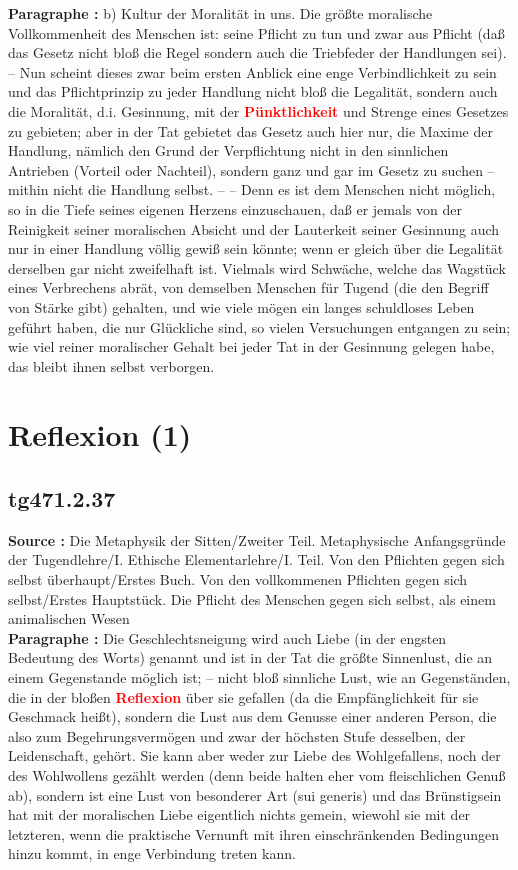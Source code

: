 \documentclass[a4paper,12pt,twoside]{book}
\newcommand{\match}[1]{\textcolor{red}{\textbf{#1}}}
\newcommand{\unnumberedsection}[1]{
	\section*{#1}
	\addcontentsline{toc}{section}{#1}
	\markright{#1}
}
\begin{document}
	\textbf{Paragraphe : }b) Kultur der Moralität in uns. Die größte moralische Vollkommenheit des Menschen ist: seine Pflicht zu tun und zwar aus Pflicht (daß das Gesetz nicht bloß die Regel sondern auch die Triebfeder der Handlungen sei). – Nun scheint dieses zwar beim ersten Anblick eine enge Verbindlichkeit zu sein und das Pflichtprinzip zu jeder Handlung nicht bloß die Legalität, sondern auch die Moralität, d.i. Gesinnung, mit der \match{Pünktlichkeit} und Strenge eines Gesetzes zu gebieten; aber in der Tat gebietet das Gesetz auch hier nur, die Maxime der Handlung, nämlich den Grund der Verpflichtung nicht in den sinnlichen Antrieben (Vorteil oder Nachteil), sondern ganz und gar im Gesetz zu suchen – mithin nicht die Handlung selbst. – – Denn es ist dem Menschen nicht möglich, so in die Tiefe seines eigenen Herzens einzuschauen, daß er jemals von der Reinigkeit seiner moralischen Absicht und der Lauterkeit seiner Gesinnung auch nur in einer Handlung völlig gewiß sein könnte; wenn er gleich über die Legalität derselben gar nicht zweifelhaft ist. Vielmals wird Schwäche, welche das Wagstück eines Verbrechens abrät, von demselben Menschen für Tugend (die den Begriff von Stärke gibt) gehalten, und wie viele mögen ein langes schuldloses Leben geführt haben, die nur Glückliche sind, so vielen Versuchungen entgangen zu sein; wie viel reiner moralischer Gehalt bei jeder Tat in der Gesinnung gelegen habe, das bleibt ihnen selbst verborgen. 
	
	\unnumberedsection{Reflexion (1)} 
	\subsection*{tg471.2.37} 
	\textbf{Source : }Die Metaphysik der Sitten/Zweiter Teil. Metaphysische Anfangsgründe der Tugendlehre/I. Ethische Elementarlehre/I. Teil. Von den Pflichten gegen sich selbst überhaupt/Erstes Buch. Von den vollkommenen Pflichten gegen sich selbst/Erstes Hauptstück. Die Pflicht des Menschen gegen sich selbst, als einem animalischen Wesen\\  
	
	\textbf{Paragraphe : }Die Geschlechtsneigung wird auch Liebe (in der engsten Bedeutung des Worts) genannt und ist in der Tat die größte Sinnenlust, die an einem Gegenstande möglich ist; – nicht bloß sinnliche Lust, wie an Gegenständen, die in der bloßen \match{Reflexion} über sie gefallen (da die Empfänglichkeit für sie Geschmack heißt), sondern die Lust aus dem Genusse einer anderen Person, die also zum Begehrungsvermögen und zwar der höchsten Stufe desselben, der Leidenschaft, gehört. Sie kann aber weder zur Liebe des Wohlgefallens, noch der des Wohlwollens gezählt werden (denn beide halten eher vom fleischlichen Genuß ab), sondern ist eine Lust von besonderer Art (sui generis) und das Brünstigsein hat mit der moralischen Liebe eigentlich nichts gemein, wiewohl sie mit der letzteren, wenn die praktische Vernunft mit ihren einschränkenden Bedingungen hinzu kommt, in enge Verbindung treten kann. 
	
\end{document}
